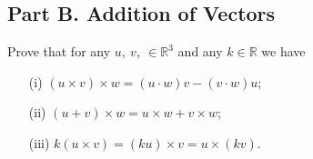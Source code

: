\documentclass[a4paper,12pt]{article}
\begin{document}
		\subsection*{Part B. Addition of Vectors}
		Prove that for any $u,\:v,\:\in\mathbb{R}^3$
		and any $k\in\mathbb{R}$ we have
\begin{itemize}
	\item[(i)] $(u\times v)\times w= (u\cdot w)v - (v\cdot w)u$;
			
	\item[(ii)]  $(u+v)\times w=u\times w + v\times w$;
			
	\item[(iii)] $k(u\times v)=(ku)\times v = u\times (kv)$.
\end{itemize} \vspace{0.4cm}
\end{document}
